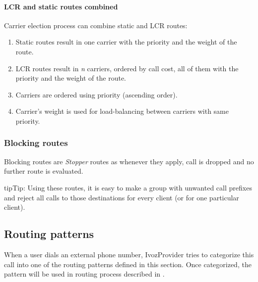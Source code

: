 \documentclass[letterpaper,10pt,english]{sphinxmanual}
\begin{document}
\paragraph{LCR and static routes combined}
\label{administration_portal/brand/routing/outgoing_routings:lcr-and-static-routes-combined}
Carrier election process can combine static and LCR routes:
\begin{enumerate}
\item {} 
Static routes result in one carrier with the priority and the weight of the route.

\item {} 
LCR routes result in \emph{n} carriers, ordered by call cost, all of them with the priority and the weight of the route.

\item {} 
Carriers are ordered using priority (ascending order).

\item {} 
Carrier's weight is used for load-balancing between carriers with same priority.

\end{enumerate}


\subsubsection{Blocking routes}
\label{administration_portal/brand/routing/outgoing_routings:blocking-routes}
Blocking routes are \emph{Stopper} routes as whenever they apply, call is dropped and no further route is evaluated.

\begin{notice}{tip}{Tip:}
Using these routes, it is easy to make a group with unwanted call prefixes and reject all calls to those
destinations for every client (or for one particular client).
\end{notice}


\subsection{Routing patterns}
\label{administration_portal/brand/routing/routing_patterns::doc}\label{administration_portal/brand/routing/routing_patterns:routing-patterns}\label{administration_portal/brand/routing/routing_patterns:id1}
When a user dials an external phone number, IvozProvider tries to categorize
this call into one of the routing patterns defined in this section. Once categorized,
the pattern will be used in routing process described in {\hyperref[administration_portal/brand/routing/outgoing_routings:outgoing\string-routings]{}}.
\end{document}
